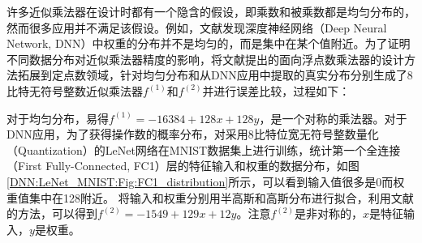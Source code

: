 许多近似乘法器在设计时都有一个隐含的假设，即乘数和被乘数都是均匀分布的，然而很多应用并不满足该假设。例如，文献\cite{DNN:WeightAnalysis2}发现深度神经网络（Deep Neural Network, DNN）中权重的分布并不是均匀的，而是集中在某个值附近。为了证明不同数据分布对近似乘法器精度的影响，将文献\cite{AC:AM:OU}提出的面向浮点数乘法器的设计方法拓展到定点数领域，针对均匀分布和从DNN应用中提取的真实分布分别生成了8比特无符号整数近似乘法器$f^{(1)}$和$f^{(2)}$并进行误差比较，过程如下：

对于均匀分布，易得$f^{(1)} = -16384 + 128 x + 128 y$，是一个对称的乘法器。对于DNN应用，为了获得操作数的概率分布，对采用8比特位宽无符号整数量化（Quantization）的LeNet网络在MNIST数据集上进行训练\cite{DNN:LeNet_MNIST}，统计第一个全连接（First Fully-Connected, FC1）层的特征输入和权重的数据分布，如图\ref{DNN:LeNet_MNIST:Fig:FC1_distribution}所示，可以看到输入值很多是0而权重值集中在128附近。
将输入和权重分别用半高斯和高斯分布进行拟合，利用文献\cite{AC:AM:OU}的方法，可以得到$f^{(2)} = -1549 + 129 x + 12 y$。注意$f^{(2)}$是非对称的，$x$是特征输入，$y$是权重。

